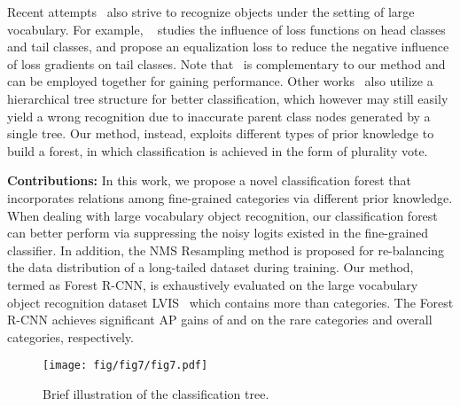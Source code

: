 \documentclass[sigconf]{acmart}
\newcommand{\myparagraph}[1]{{\vspace{0.5em} \noindent \bf #1}}
\begin{document}
Recent attempts~\cite{equalization_loss,tan2020equalization,rfcn3000,yolo9000,ouyang_cvpr16} also strive to recognize objects under the setting of large vocabulary. For example, ~\cite{equalization_loss} studies the influence of loss functions on head classes and tail classes, and propose an equalization loss to reduce the negative influence of loss gradients on tail classes. Note that~\cite{equalization_loss} is complementary to our method and can be employed together for gaining performance. Other works~\cite{rfcn3000,yolo9000,ouyang_cvpr16} also utilize a hierarchical tree structure for better classification, which however may still easily yield a wrong recognition due to inaccurate parent class nodes generated by a single tree. Our method, instead, exploits different types of prior knowledge to build a forest, in which classification is achieved in the form of plurality vote.

\myparagraph{Contributions:} In this work, we propose a novel classification forest that incorporates relations among fine-grained categories via different prior knowledge. When dealing with large vocabulary object recognition, our classification forest can better perform via suppressing the noisy logits existed in the fine-grained classifier. In addition, the NMS Resampling method is proposed for re-balancing the data distribution of a long-tailed dataset during training. Our method, termed as Forest R-CNN, is exhaustively evaluated on the large vocabulary object recognition dataset LVIS~\cite{lvis} which contains more than  categories. The Forest R-CNN achieves significant AP gains of  and  on the rare categories and overall categories, respectively.

\begin{figure}
	\centering
	\texttt{[image: fig/fig7/fig7.pdf]}
	\vspace{-7mm}
	\caption{Brief illustration of the classification tree.}
	\label{fig:illustration}
	\vspace{-4mm}
\end{figure}

\vspace{-2mm}
\end{document}
